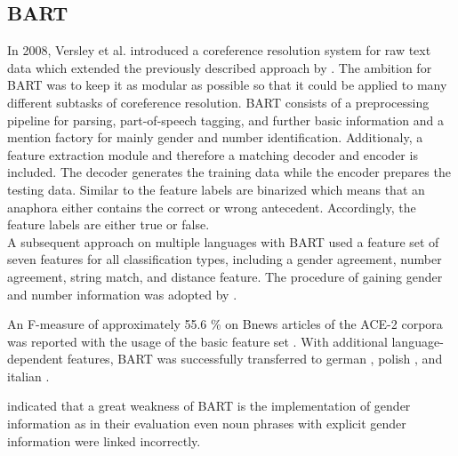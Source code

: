 \subsection{BART}
\nocite{versley2008bart}
In 2008, Versley et al. introduced a coreference resolution system for raw text data which extended the previously described approach by \cite{soon2001machine}. The ambition for BART was to keep it as modular as possible so that it could be applied to many different subtasks of coreference resolution. BART consists of a preprocessing pipeline for parsing, part-of-speech tagging, and further basic information and a mention factory for mainly gender and number identification. Additionaly, a feature extraction module and therefore a matching decoder and encoder is included. The decoder generates the training data while the encoder prepares the testing data. Similar to \citep{soon2001machine} the feature labels are binarized which means that an anaphora either contains the correct or wrong antecedent. Accordingly, the feature labels are either true or false. \\
A subsequent approach on multiple languages with BART \citep{broscheit2010bart} used a feature set of seven features for all classification types, including a gender agreement, number agreement, string match, and distance feature. The procedure of gaining gender and number information was adopted by \cite{soon2001machine}. 

An F-measure of approximately 55.6 \% on Bnews articles of the ACE-2 corpora was reported with the usage of the basic feature set \citep{versley2008bart}. 
With additional language-dependent features, BART was successfully transferred to german \citep{broscheit2010extending}, polish \citep{kopec2012creating}, and italian \citep{poesio2010creating}.

\citep{reiteretal:2011b} indicated that a great weakness of BART is the implementation of gender information as in their evaluation even noun phrases with explicit gender information were linked incorrectly.

